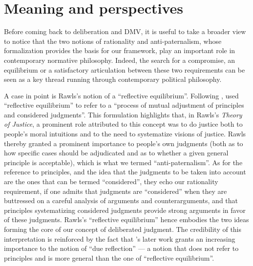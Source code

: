 \documentclass[version=3.21, pagesize, twoside=off, bibliography=totoc, DIV=calc, fontsize=12pt, a4paper, french, english]{scrartcl}
\begin{document}
\section{Meaning and perspectives}
\label{disc}
Before coming back to deliberation and DMV, it is useful to take a broader view to notice that the two notions of rationality and anti-paternalism, whose formalization provides the basis for our framework, play an important role in contemporary normative philosophy. 
Indeed, the search for a compromise, an equilibrium or a satisfactory articulation between these two requirements can be seen as a key thread running through contemporary political philosophy.

A case in point is Rawls’s notion of a “reflective equilibrium”. 
Following \citet{goodman_fact_1983}, \citet[][p.18]{rawls_theory_1999} used “reflective equilibrium” to refer to a “process of mutual adjustment of principles and considered judgments”. 
This formulation highlights that, in Rawls's \emph{Theory of Justice}, a prominent role attributed to this concept was to do justice both to people's moral intuitions and to the need to systematize visions of justice. 
Rawls thereby granted a prominent importance to people's own judgments (both as to how specific cases should be adjudicated and as to whether a given general principle is acceptable), which is what we termed  “anti-paternalism”. 
As for the reference to principles, and the idea that the judgments to be taken into account are the ones that can be termed “considered”, they echo our rationality requirement, if one admits that judgments are  “considered” when they are buttressed on a careful analysis of arguments and counterarguments, and that principles systematizing considered judgments provide strong arguments in favor of these judgments. 
Rawls's “reflective equilibrium” hence embodies the two ideas forming the core of our concept of deliberated judgment. 
The credibility of this interpretation is reinforced by the fact that \citeauthor{rawls_political_2005}’s \citeyearpar{rawls_political_2005} later work grants an increasing importance to the notion of “due reflection” --- a notion that does not refer to principles and is more general than the one of “reflective equilibrium”. 
\end{document}
